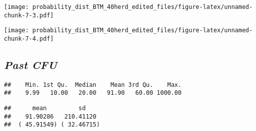 \documentclass[]{article}
\newenvironment{Shaded}{\begin{snugshade}}{\end{snugshade}}
\newcommand{\KeywordTok}[1]{\textcolor[rgb]{0.13,0.29,0.53}{\textbf{#1}}}
\newcommand{\FloatTok}[1]{\textcolor[rgb]{0.00,0.00,0.81}{#1}}
\newcommand{\StringTok}[1]{\textcolor[rgb]{0.31,0.60,0.02}{#1}}
\newcommand{\CommentTok}[1]{\textcolor[rgb]{0.56,0.35,0.01}{\textit{#1}}}
\newcommand{\OperatorTok}[1]{\textcolor[rgb]{0.81,0.36,0.00}{\textbf{#1}}}
\newcommand{\NormalTok}[1]{#1}
\begin{document}
\texttt{[image: probability\_dist\_BTM\_40herd\_edited\_files/figure-latex/unnamed-chunk-7-3.pdf]}

\begin{Shaded}
\end{Shaded}

\texttt{[image: probability\_dist\_BTM\_40herd\_edited\_files/figure-latex/unnamed-chunk-7-4.pdf]}

\subsection{\texorpdfstring{\textbf{\emph{Past
CFU}}}{Past CFU}}\label{past-cfu}

\begin{Shaded}
\end{Shaded}

\begin{verbatim}
##    Min. 1st Qu.  Median    Mean 3rd Qu.    Max. 
##    9.99   10.00   20.00   91.90   60.00 1000.00
\end{verbatim}

\begin{Shaded}
\end{Shaded}

\begin{verbatim}
##      mean         sd    
##    91.90286   210.41120 
##  ( 45.91549) ( 32.46715)
\end{verbatim}
\end{document}
